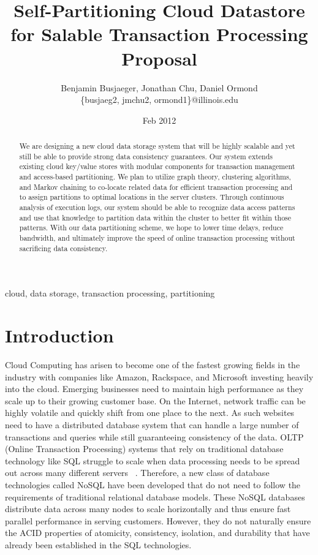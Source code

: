 \documentclass[10pt,final,journal]{IEEEtran}
\begin{document}
\title{Self-Partitioning Cloud Datastore for Salable Transaction Processing Proposal}
\author{Benjamin Busjaeger, Jonathan Chu, Daniel Ormond \\
\{busjaeg2, jmchu2, ormond1\}@illinois.edu}
\date{Feb 2012}
\maketitle

\begin{abstract}
We are designing a new cloud data storage system that will be highly scalable and yet still be able to provide strong data consistency guarantees. Our system extends existing cloud key/value stores with modular components for transaction management and access-based partitioning. We plan to utilize graph theory, clustering algorithms, and Markov chaining to co-locate related data for efficient transaction processing and to assign partitions to optimal locations in the server clusters. Through continuous analysis of execution logs, our system should be able to recognize data access patterns and use that knowledge to partition data within the cluster to better fit within those patterns. With our data partitioning scheme, we hope to lower time delays, reduce bandwidth, and ultimately improve the speed of online transaction processing without sacrificing data consistency.
\end{abstract}

\begin{IEEEkeywords}
cloud, data storage, transaction processing, partitioning
\end{IEEEkeywords}

\section{Introduction}
Cloud Computing has arisen to become one of the fastest growing fields in the industry with companies like Amazon, Rackspace, and Microsoft investing heavily into the cloud. Emerging businesses need to maintain high performance as they scale up to their growing customer base. On the Internet, network traffic can be highly volatile and quickly shift from one place to the next. As such websites need to have a distributed database system that can handle a large number of transactions and queries while still guaranteeing consistency of the data. OLTP (Online Transaction Processing) systems that rely on traditional database technology like SQL struggle to scale when data processing needs to be spread out across many different servers ~\cite{Malkowski:2010:EAD:1774088.1774449}. Therefore, a new class of database technologies called NoSQL have been developed that do not need to follow the requirements of traditional relational database models. These NoSQL databases distribute data across many nodes to scale horizontally and thus ensure fast parallel performance in serving customers.  However, they do not naturally ensure the ACID properties of atomicity, consistency, isolation, and durability that have already been established in the SQL technologies.
\end{document}

